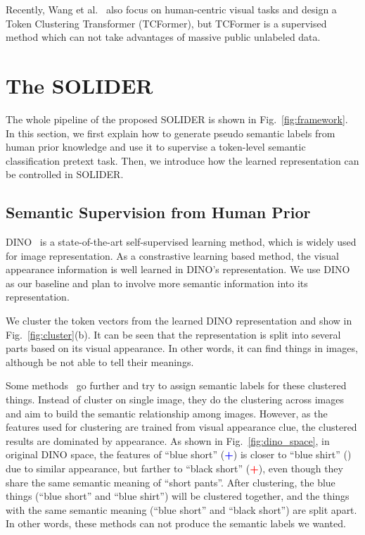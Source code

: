 \documentclass[10pt,twocolumn,letterpaper]{article}
\begin{document}
Recently, Wang et al.~\cite{zeng2022not} also focus on human-centric visual tasks and design a Token Clustering Transformer (TCFormer), but TCFormer is a supervised method which can not take advantages of massive public unlabeled data.


\section{The SOLIDER}

The whole pipeline of the proposed SOLIDER is shown in Fig.~\ref{fig:framework}. In this section, we first explain how to generate pseudo semantic labels from human prior knowledge and  use it to supervise a token-level semantic classification pretext task. Then, we introduce how the learned representation can be controlled in SOLIDER.

\subsection{Semantic Supervision from Human Prior}
\label{sec:humanprior}

DINO~\cite{dino} is a state-of-the-art self-supervised learning method, which is widely used for image representation. As a constrastive learning based method, the visual appearance information is well learned in DINO's representation. We use DINO as our baseline and plan to involve more semantic information into its representation.

We cluster the token vectors from the learned DINO representation and show in Fig.~\ref{fig:cluster}(b). It can be seen that the representation is split into several parts based on its visual appearance. In other words, it can find things in images, although be not able to tell their meanings.

Some methods~\cite{deepcluster,Cho2021PiCIE} go further and try to assign semantic labels for these clustered things. Instead of cluster on single image, they do the clustering across images and aim to build the semantic relationship among images. However, as the features used for clustering are trained from visual appearance clue, the clustered results are dominated by appearance.
As shown in Fig.~\ref{fig:dino_space}, in original DINO space, the features of ``blue short'' (\textcolor{blue}{\textbf{+}}) is closer to ``blue shirt'' (\textcolor{red}{}) due to similar appearance, but farther to ``black short'' (\textcolor{red}{\textbf{+}}), even though they share the same semantic meaning of ``short pants''. After clustering, the blue things (``blue short'' and ``blue shirt'') will be clustered together, and the things with the same semantic meaning (``blue short'' and ``black short'') are split apart. In other words, these methods can not produce the semantic labels we wanted.
\end{document}
